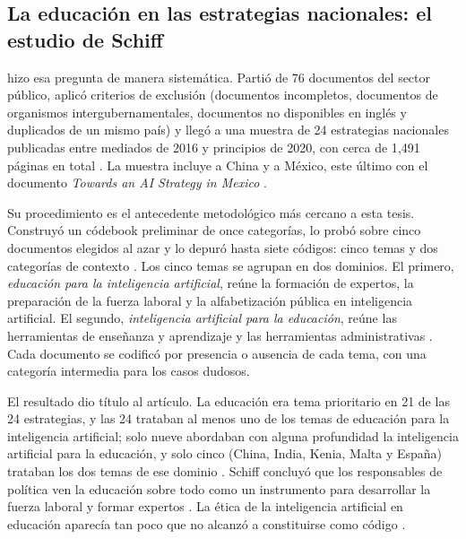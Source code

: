 \subsection{La educación en las estrategias nacionales: el estudio de Schiff}
\label{subsec:ea-schiff}

\citet{schiff2022education} hizo esa pregunta de manera sistemática. Partió de 76
documentos del sector público, aplicó criterios de exclusión (documentos incompletos,
documentos de organismos intergubernamentales, documentos no disponibles en inglés y
duplicados de un mismo país) y llegó a una muestra de 24 estrategias nacionales publicadas
entre mediados de 2016 y principios de 2020, con cerca de 1{,}491 páginas en total
\citep[pp.~531--532, 552]{schiff2022education}. La muestra incluye a China y a México, este
último con el documento \textit{Towards an AI Strategy in Mexico}
\citep[p.~535]{schiff2022education}.

Su procedimiento es el antecedente metodológico más cercano a esta tesis. Construyó un
códebook preliminar de once categorías, lo probó sobre cinco documentos elegidos al azar y
lo depuró hasta siete códigos: cinco temas y dos categorías de contexto
\citep[pp.~533, 553--554]{schiff2022education}. Los cinco temas se agrupan en dos dominios.
El primero, \textit{educación para la inteligencia artificial}, reúne la formación de
expertos, la preparación de la fuerza laboral y la alfabetización pública en inteligencia
artificial. El segundo, \textit{inteligencia artificial para la educación}, reúne las
herramientas de enseñanza y aprendizaje y las herramientas administrativas
\citep[p.~534]{schiff2022education}. Cada documento se codificó por presencia o ausencia de
cada tema, con una categoría intermedia para los casos dudosos.

El resultado dio título al artículo. La educación era tema prioritario en 21 de las 24
estrategias, y las 24 trataban al menos uno de los temas de educación para la inteligencia
artificial; solo nueve abordaban con alguna profundidad la inteligencia artificial para la
educación, y solo cinco (China, India, Kenia, Malta y España) trataban los dos temas de ese
dominio \citep[p.~535]{schiff2022education}. Schiff concluyó que los responsables de
política ven la educación sobre todo como un instrumento para desarrollar la fuerza laboral
y formar expertos \citep[p.~550]{schiff2022education}. La ética de la inteligencia
artificial en educación aparecía tan poco que no alcanzó a constituirse como código
\citep[p.~534]{schiff2022education}.

